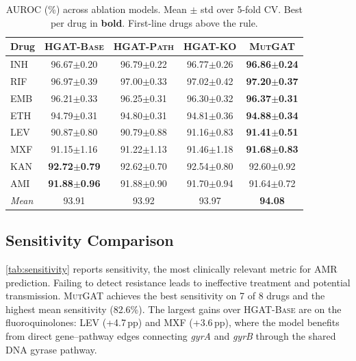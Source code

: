 \documentclass{article}
\theoremstyle{plain}
\theoremstyle{definition}
\theoremstyle{remark}
\begin{document}
\begin{table}[t]
\caption{AUROC (\%) across ablation models. Mean $\pm$ std over 5-fold CV. Best per drug in \textbf{bold}. First-line drugs above the rule.}
\label{tab:auroc}
\vskip 0.1in
\begin{center}
\begin{small}
\begin{tabular}{lcccc}
\toprule
Drug & \textsc{HGAT-Base} & \textsc{HGAT-Path} & \textsc{HGAT-KO} & \textsc{MutGAT} \\
\midrule
INH & 96.67$\pm$0.20 & 96.79$\pm$0.22 & 96.77$\pm$0.26 & \textbf{96.86$\pm$0.24} \\
RIF & 96.97$\pm$0.39 & 97.00$\pm$0.33 & 97.02$\pm$0.42 & \textbf{97.20$\pm$0.37} \\
EMB & 96.21$\pm$0.33 & 96.25$\pm$0.31 & 96.30$\pm$0.32 & \textbf{96.37$\pm$0.31} \\
ETH & 94.79$\pm$0.31 & 94.80$\pm$0.31 & 94.81$\pm$0.36 & \textbf{94.88$\pm$0.34} \\
\midrule
LEV & 90.87$\pm$0.80 & 90.79$\pm$0.88 & 91.16$\pm$0.83 & \textbf{91.41$\pm$0.51} \\
MXF & 91.15$\pm$1.16 & 91.22$\pm$1.13 & 91.46$\pm$1.18 & \textbf{91.68$\pm$0.83} \\
KAN & \textbf{92.72$\pm$0.79} & 92.62$\pm$0.70 & 92.54$\pm$0.80 & 92.60$\pm$0.92 \\
AMI & \textbf{91.88$\pm$0.96} & 91.88$\pm$0.90 & 91.70$\pm$0.94 & 91.64$\pm$0.72 \\
\midrule
\textit{Mean} & 93.91 & 93.92 & 93.97 & \textbf{94.08} \\
\bottomrule
\end{tabular}
\end{small}
\end{center}
\end{table}

\subsection{Sensitivity Comparison}

\cref{tab:sensitivity} reports sensitivity, the most clinically relevant metric for AMR prediction. Failing to detect resistance leads to ineffective treatment and potential transmission. \textsc{MutGAT} achieves the best sensitivity on 7 of 8 drugs and the highest mean sensitivity (82.6\%). The largest gains over \textsc{HGAT-Base} are on the fluoroquinolones: LEV (+4.7\,pp) and MXF (+3.6\,pp), where the model benefits from direct gene--pathway edges connecting \textit{gyrA} and \textit{gyrB} through the shared DNA gyrase pathway.
\end{document}
